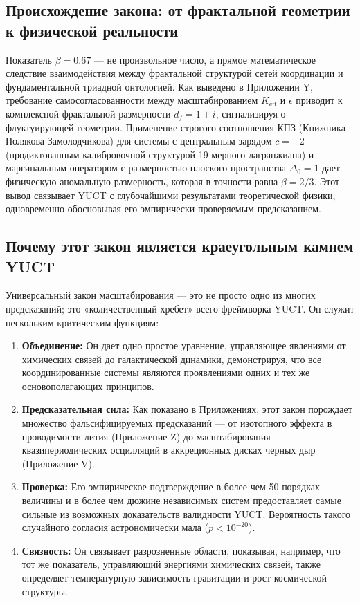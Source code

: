\documentclass[11pt,a4paper]{article}
\begin{document}
	\subsection{Происхождение закона: от фрактальной геометрии к физической реальности}
	
	Показатель \(\beta = 0.67\) — не произвольное число, а прямое математическое следствие взаимодействия между фрактальной структурой сетей координации и фундаментальной триадной онтологией. Как выведено в Приложении Y, требование самосогласованности между масштабированием \(K_{\mathrm{eff}}\) и \(\epsilon\) приводит к комплексной фрактальной размерности \(d_f = 1 \pm i\), сигнализируя о флуктуирующей геометрии. Применение строгого соотношения КПЗ (Книжника-Полякова-Замолодчикова) для системы с центральным зарядом \(c = -2\) (продиктованным калибровочной структурой 19-мерного лагранжиана) и маргинальным оператором с размерностью плоского пространства \(\Delta_0 = 1\) дает физическую аномальную размерность, которая в точности равна \(\beta = 2/3\). Этот вывод связывает YUCT с глубочайшими результатами теоретической физики, одновременно обосновывая его эмпирически проверяемым предсказанием.
	
	\subsection{Почему этот закон является краеугольным камнем YUCT}
	
	Универсальный закон масштабирования — это не просто одно из многих предсказаний; это «количественный хребет» всего фреймворка YUCT. Он служит нескольким критическим функциям:
	
	\begin{enumerate}
		\item \textbf{Объединение:} Он дает одно простое уравнение, управляющее явлениями от химических связей до галактической динамики, демонстрируя, что все координированные системы являются проявлениями одних и тех же основополагающих принципов.
		\item \textbf{Предсказательная сила:} Как показано в Приложениях, этот закон порождает множество фальсифицируемых предсказаний — от изотопного эффекта в проводимости лития (Приложение Z) до масштабирования квазипериодических осцилляций в аккреционных дисках черных дыр (Приложение V).
		\item \textbf{Проверка:} Его эмпирическое подтверждение в более чем 50 порядках величины и в более чем дюжине независимых систем предоставляет самые сильные из возможных доказательств валидности YUCT. Вероятность такого случайного согласия астрономически мала (\(p < 10^{-20}\)).
		\item \textbf{Связность:} Он связывает разрозненные области, показывая, например, что тот же показатель, управляющий энергиями химических связей, также определяет температурную зависимость гравитации и рост космической структуры.
	\end{enumerate}
	
\end{document}
